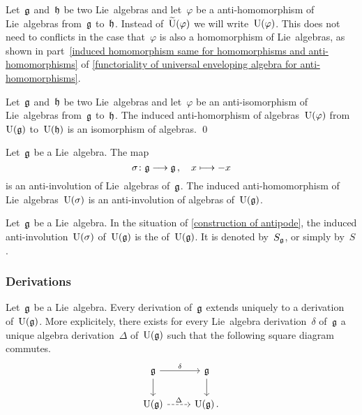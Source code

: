 \begin{notation}
	Let~$\mathfrak{g}$ and~$\mathfrak{h}$ be two Lie~algebras and let~$\varphi$ be a anti-homomorphism of Lie~algebras from~$\mathfrak{g}$ to~$\mathfrak{h}$.
	Instead of~$\widetilde{\operatorname{U}}(\varphi)$ we will write~$\operatorname{U}(\varphi)$.
	This does not need to conflicts in the case that~$\varphi$ is also a homomorphism of Lie~algebras, as shown in part~\ref{induced homomorphism same for homomorphisms and anti-homomorphisms} of \cref{functoriality of universal enveloping algebra for anti-homomorphisms}.
\end{notation}


\begin{corollary}
	\label{anti-isomorphism of lie-algebras induces anti-isomorphism of algebras}
	Let~$\mathfrak{g}$ and~$\mathfrak{h}$ be two Lie~algebras and let~$\varphi$ be an anti-isomorphism of Lie~algebras from~$\mathfrak{g}$ to~$\mathfrak{h}$.
	The induced anti-homorphism of algebras~$\operatorname{U}(\varphi)$ from~$\operatorname{U}(\mathfrak{g})$ to~$\operatorname{U}(\mathfrak{h})$ is an isomorphism of algebras.
	\qed
\end{corollary}


\begin{example}
	\label{construction of antipode}
	Let~$\mathfrak{g}$ be a Lie~algebra.
	The map
	\[
		\sigma
		\colon
		\glie
		\to
		\glie \,,
		\quad
		x
		\mapsto
		-x
	\]
	is an anti-involution of Lie~algebras of~$\mathfrak{g}$.
	The induced anti-homomorphism of Lie~algebras~$\operatorname{U}(\sigma)$ is an anti-involution of algebras of~$\operatorname{U}(\mathfrak{g})$.
\end{example}


\begin{definition}
	Let~$\mathfrak{g}$ be a Lie~algebra.
	In the situation of \cref{construction of antipode}, the induced anti-involution~$\operatorname{U}(\sigma)$ of~$\operatorname{U}(\mathfrak{g})$ is the  of~$\operatorname{U}(\mathfrak{g})$.
	It is denoted by~$S_{\mathfrak{g}}$, or simply by~$S$.
\end{definition}


\subsubsection{Derivations}

\begin{proposition}
	\label{extending derivation to universal enveloping algebra}
	Let~$\mathfrak{g}$ be a Lie~algebra.
	Every derivation of~$\mathfrak{g}$ extends uniquely to a derivation of~$\operatorname{U}(\mathfrak{g})$.
	More explicitely, there exists for every Lie~algebra derivation~$\delta$ of~$\mathfrak{g}$ a unique algebra derivation~$\Delta$ of~$\operatorname{U}(\mathfrak{g})$ such that the following square diagram commutes.
	\[
		\begin{tikzcd}
			\glie
			\arrow{r}[above]{\delta}
			\arrow{d}
			&
			\glie
			\arrow{d}
			\\
			\Univ(\glie)
			\arrow[dashed]{r}[above]{\Delta}
			&
			\Univ(\glie) \,.
		\end{tikzcd}
	\]
\end{proposition}


